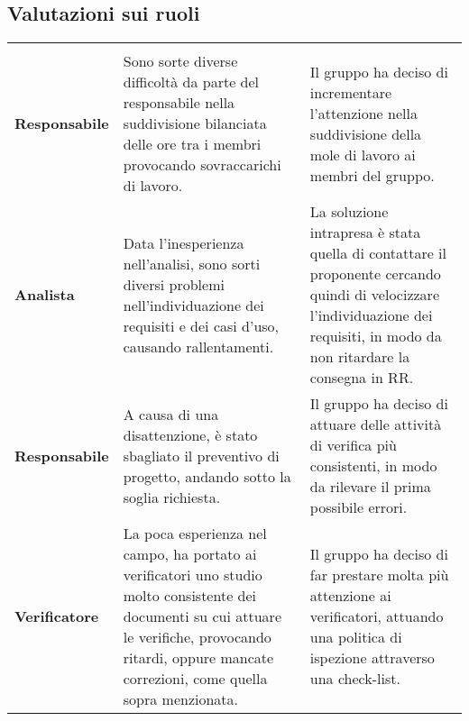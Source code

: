 \documentclass[../piano-di-qualifica.tex]{subfiles}
\begin{document}
\newpage
\subsection{Valutazioni sui ruoli}

\begin{longtable}[H]{>{\centering\bfseries}m{4cm} >{\centering\arraybackslash}m{6cm} >{\centering\arraybackslash}m{6cm}}
  \rowcolor{darkgray!90!}
  \color{white}{\textbf{Ruolo}} & \color{white}{\textbf{Problema}}                                                                                                                                                                              & \color{white}{\textbf{Soluzione}}                                                                                                                                               \\
  Responsabile                  & Sono sorte diverse difficoltà da parte del responsabile nella suddivisione bilanciata delle ore tra i membri provocando sovraccarichi di lavoro.                                                              & Il gruppo ha deciso di incrementare l'attenzione nella suddivisione della mole di lavoro ai membri del gruppo.                                                                  \\
  Analista                      & Data l'inesperienza nell'analisi, sono sorti diversi problemi nell'individuazione dei requisiti e dei casi d'uso, causando rallentamenti.                                                                     & La soluzione intrapresa è stata quella di contattare il proponente cercando quindi di velocizzare l'individuazione dei requisiti, in modo da non ritardare la consegna in RR\@. \\
  Responsabile                  & A causa di una disattenzione, è stato sbagliato il preventivo di progetto, andando sotto la soglia richiesta.                                                                                                 & Il gruppo ha deciso di attuare delle attività di verifica più consistenti, in modo da rilevare il prima possibile errori.                                                       \\
  Verificatore                  & La poca esperienza nel campo, ha portato ai verificatori uno studio molto consistente dei documenti su cui attuare le verifiche, provocando ritardi, oppure mancate correzioni, come quella sopra menzionata. & Il gruppo ha deciso di far prestare molta più attenzione ai verificatori, attuando una politica di ispezione attraverso una check-list.                                         \\

\end{longtable}
\end{document}
